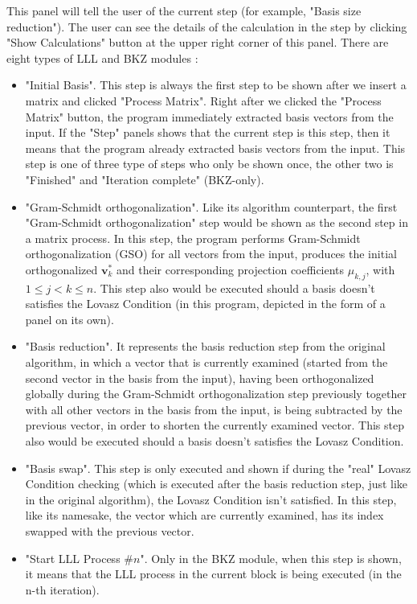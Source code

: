\documentclass[runningheads]{llncs}
\begin{document}
This panel will tell the user of the current step (for example, "Basis size reduction"). The user can see the details of the calculation in the step by clicking "Show Calculations" button at the upper right corner of this panel. There are eight types of LLL and BKZ modules : 
\begin{itemize}
\raggedright
\item "Initial Basis". This step is always the first step to be shown after we insert a matrix and clicked "Process Matrix". Right after we clicked the "Process Matrix" button, the program immediately extracted basis vectors from the input. If the "Step" panels shows that the current step is this step, then it means that the program already extracted basis vectors from the input. This step is one of three type of steps who only be shown once, the other two is "Finished" and "Iteration complete" (BKZ-only).
\item "Gram-Schmidt orthogonalization". Like its algorithm counterpart, the first "Gram-Schmidt orthogonalization" step would be shown as the second step in a matrix process. In this step, the program performs Gram-Schmidt orthogonalization (GSO) for all vectors from the input, produces the initial orthogonalized $\mathbf{v}_k^*$ and their corresponding projection coefficients $\mu_{k,j}$, with $1 \le j < k \le n$. This step also would be executed should a basis doesn't satisfies the Lovasz Condition (in this program, depicted in the form of a panel on its own). 
\item "Basis reduction". It represents the basis reduction step from the original algorithm, in which a vector that is currently examined (started from the second vector in the basis from the input), having been orthogonalized globally during the Gram-Schmidt orthogonalization step previously together with all other vectors in the basis from the input, is being subtracted by the previous vector, in order to shorten the currently examined vector. This step also would be executed should a basis doesn't satisfies the Lovasz Condition. 
\item "Basis swap". This step is only executed and shown if during the "real" Lovasz Condition checking (which is executed after the basis reduction step, just like in the original algorithm), the Lovasz Condition isn't satisfied. In this step, like its namesake, the vector which are currently examined, has its index swapped with the previous vector. 
\item "Start LLL Process $\#n$". Only in the BKZ module, when this step is shown, it means that the LLL process in the current block is being executed (in the n-th iteration). 

\end{itemize}
\end{document}
